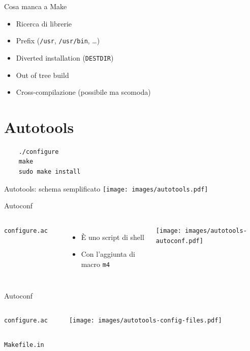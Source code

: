 \documentclass[xetex,table]{beamer}
\begin{document}
\begin{frame}{Cosa manca a Make}
  \begin{itemize}
  \item Ricerca di librerie
  \item Prefix (\texttt{/usr}, \texttt{/usr/bin}, \dots)
  \item Diverted installation (\texttt{DESTDIR})
  \item Out of tree build
  \item Cross-compilazione (possibile ma scomoda)
  \end{itemize}
\end{frame}

\section{Autotools}

\begin{frame}[fragile]
  \begin{center}
  \begin{verbatim}
    ./configure
    make
    sudo make install
  \end{verbatim}
  \end{center}
\end{frame}

\begin{frame}{Autotools: schema semplificato}
  \center\texttt{[image: images/autotools.pdf]}
\end{frame}

\begin{frame}[fragile]{Autoconf}
  \begin{columns}
    \texttt{configure.ac}
    \inputminted[bgcolor=codebackground,frame=single]{shell}{examples/3-autotools-1/configure.ac}

    \begin{itemize}
    \item È uno script di shell
    \item Con l'aggiunta di macro \texttt{m4}
    \end{itemize}

    \texttt{[image: images/autotools-autoconf.pdf]}
  \end{columns}
\end{frame}

\begin{frame}{Autoconf}
  \small

  \begin{columns}
    \texttt{configure.ac}
    \inputminted[bgcolor=codebackground,frame=single]{shell}{examples/3-autotools-2/configure.ac}

    \texttt{[image: images/autotools-config-files.pdf]}
  \end{columns}

  \texttt{Makefile.in}
  \inputminted[bgcolor=codebackground,frame=single]{makefile}{examples/3-autotools-2/Makefile.in}
\end{frame}
\end{document}
